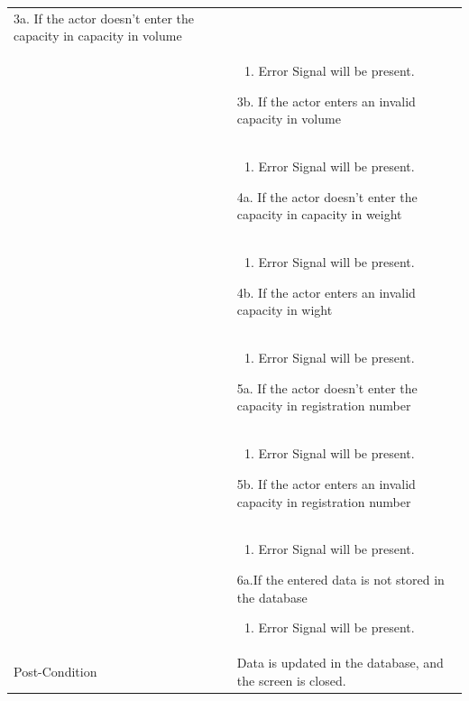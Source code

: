 \documentclass[12pt,a4paper]{article}
\begin{document}
\begin{longtable}{| p{3cm}|p{12cm}|}
3a. If the actor doesn't enter the capacity in capacity in volume\\ 	
&	\begin{enumerate}
		\item Error Signal will be present.
	\end{enumerate}
3b. If the actor enters an invalid capacity in volume \\ 	
&	\begin{enumerate}
		\item Error Signal will be present.
	\end{enumerate}
4a. If the actor doesn't enter the capacity in capacity in weight\\ 	
&	\begin{enumerate}
		\item Error Signal will be present.
	\end{enumerate}
4b. If the actor enters an invalid capacity in wight\\ 	
&	\begin{enumerate}
		\item Error Signal will be present.
	\end{enumerate}
5a. If the actor doesn't enter the capacity in registration number\\ 	
&	\begin{enumerate}
		\item Error Signal will be present.
	\end{enumerate}
5b. If the actor enters an invalid capacity in registration number\\ 	
&	\begin{enumerate}
		\item Error Signal will be present.
	\end{enumerate}
6a.If the entered data is not stored in the database  
\begin{enumerate}
		\item Error Signal will be present.
	\end{enumerate}
\\ \hline
Post-Condition &  Data is updated in the database, and the screen is closed. \\\hline
\end{longtable}
\end{document}

